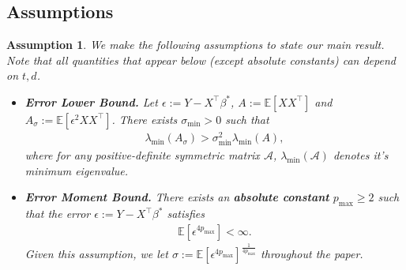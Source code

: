 \documentclass[11pt, reqno,english]{amsart}
\newtheorem{assumption}{Assumption}[section]
\begin{document}
\subsection{Assumptions}
\begin{assumption}\label{assump} We make the following assumptions to state our main result. Note that all quantities that appear below (except absolute constants) can depend on $t,d$.
\begin{itemize}[leftmargin=0.3in]
\item[(i)] \textbf{Error Lower Bound.} Let $\epsilon:= Y - X^\top \beta^*$, $A := \mathbb{E}[XX^\top]$ and $A_{\sigma} := \mathbb{E}[\epsilon^2 XX^\top]$. There exists $\sigma_{\min} > 0$ such that
\begin{align*}
    \lambda_{\min}(A_{\sigma}) > \sigma^2_{\min} \lambda_{\min}(A),
\end{align*}
where for any positive-definite symmetric matrix $\mathcal A$, $\lambda_{\min}(\mathcal A)$ denotes it's minimum eigenvalue. 
\item[(ii)] \textbf{Error Moment Bound.} There exists an \textbf{absolute constant} $p_{\max} \geq 2$ such that the error $\epsilon := Y - X^\top \beta^*$ satisfies
\begin{align*}
\mathbb{E}[\epsilon^{4p_{\max}}] < \infty.
\end{align*}
Given this assumption, we let $\sigma := \mathbb{E}[\epsilon^{4p_{\max}}]^{\frac{1}{4p_{\max}}}$ throughout the paper. 


\end{itemize}
\end{assumption}
\end{document}
